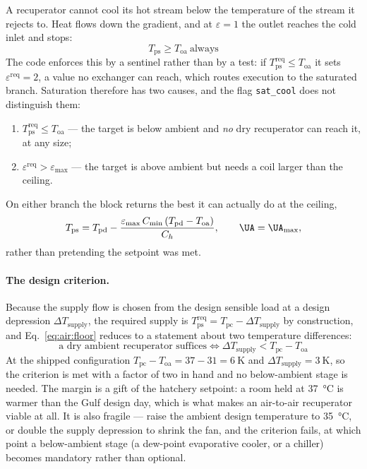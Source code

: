A recuperator cannot cool its hot stream below the temperature of the stream it
rejects to. Heat flows down the gradient, and at $\varepsilon=1$ the outlet
reaches the cold inlet and stops:
\begin{equation}
\boxed{\;T_{\mathrm{ps}} \ge T_{\mathrm{oa}}\ \text{always}\;}
\label{eq:air:floor}
\end{equation}
The code enforces this by a sentinel rather than by a test: if
$T_{\mathrm{ps}}^{\mathrm{req}}\le T_{\mathrm{oa}}$ it sets
$\varepsilon^{\mathrm{req}}=2$, a value no exchanger can reach, which routes
execution to the saturated branch. Saturation therefore has two causes, and the
flag \texttt{sat\_cool} does not distinguish them:
\begin{enumerate}[nosep]
\item $T_{\mathrm{ps}}^{\mathrm{req}}\le T_{\mathrm{oa}}$ --- the target is
below ambient and \emph{no} dry recuperator can reach it, at any size;
\item $\varepsilon^{\mathrm{req}}>\varepsilon_{\max}$ --- the target is above
ambient but needs a coil larger than the ceiling.
\end{enumerate}
On either branch the block returns the best it can actually do at the ceiling,
\begin{equation}
T_{\mathrm{ps}} = T_{\mathrm{pd}}
- \frac{\varepsilon_{\max}\,C_{\min}\left(T_{\mathrm{pd}}-T_{\mathrm{oa}}\right)}
       {C_h},
\qquad \UA = \UA_{\max},
\label{eq:air:coolsat}
\end{equation}
rather than pretending the setpoint was met.

\paragraph{The design criterion.} Because the supply flow is chosen from the
design sensible load at a design depression $\Delta T_{\mathrm{supply}}$, the
required supply is $T_{\mathrm{ps}}^{\mathrm{req}} = T_{\mathrm{pc}} -
\Delta T_{\mathrm{supply}}$ by construction, and Eq.~\eqref{eq:air:floor}
reduces to a statement about two temperature differences:
\begin{equation}
\boxed{\;
\text{a dry ambient recuperator suffices}
\iff
\Delta T_{\mathrm{supply}} < T_{\mathrm{pc}} - T_{\mathrm{oa}}
\;}
\label{eq:air:coolercrit}
\end{equation}
At the shipped configuration $T_{\mathrm{pc}}-T_{\mathrm{oa}} =
37-31 = \SI{6}{\kelvin}$ and $\Delta T_{\mathrm{supply}}=\SI{3}{\kelvin}$, so
the criterion is met with a factor of two in hand and no below-ambient stage is
needed. The margin is a gift of the hatchery setpoint: a room held at
\SI{37}{\celsius} is warmer than the Gulf design day, which is what makes an
air-to-air recuperator viable at all. It is also fragile --- raise the ambient
design temperature to \SI{35}{\celsius}, or double the supply depression to
shrink the fan, and the criterion fails, at which point a below-ambient stage
(a dew-point evaporative cooler, or a chiller) becomes mandatory rather than
optional.

